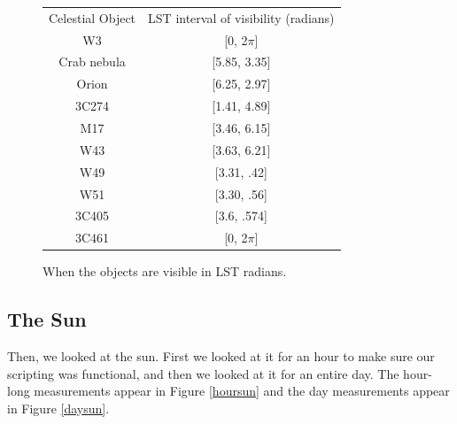 \documentclass[11pt]{article}
\begin{document}
\begin{figure}
\centering
\begin{tabular}{c|c}
Celestial Object & LST interval of visibility (radians) \\
W3 & [0, 2$\pi$] \\
Crab nebula & [5.85, 3.35] \\
Orion & [6.25, 2.97] \\
3C274 & [1.41, 4.89] \\
M17 & [3.46, 6.15] \\
W43 & [3.63, 6.21] \\
W49 & [3.31, .42] \\
W51 & [3.30, .56] \\
3C405 & [3.6, .574] \\
3C461 & [0, 2$\pi$]
\end{tabular}
\caption{When the objects are visible in LST radians. \label{lsts}}
\end{figure}

\subsection{The Sun}
Then, we looked at the sun. First we looked at it for an hour to make sure our scripting was functional, and then we looked at it for an entire day. The hour-long measurements appear in Figure \ref{hoursun} and the day measurements appear in Figure \ref{daysun}.
\end{document}
